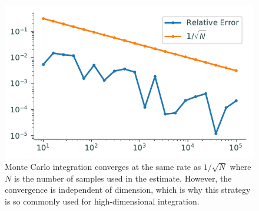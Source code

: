 \begin{figure}[H] %
\includegraphics[width=.7\textwidth]{figures/mc_convergence.pdf}
\caption{Monte Carlo integration converges at the same rate as $1/\sqrt{N}$ where $N$ is the number of samples used in the estimate.
However, the convergence is independent of dimension, which is why this strategy is so commonly used for high-dimensional integration.
}
\label{fig:monte-carlo-convergence}
\end{figure}

